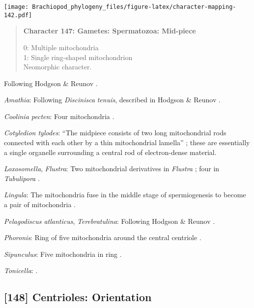 \documentclass[openany]{book}
\theoremstyle{definition}
\theoremstyle{definition}
\theoremstyle{definition}
\theoremstyle{remark}
\begin{document}
\texttt{[image: Brachiopod\_phylogeny\_files/figure-latex/character-mapping-142.pdf]}

\begin{quote}
\textbf{Character 147: Gametes: Spermatozoa: Mid-piece}

0: Multiple mitochondria\\
1: Single ring-shaped mitochondrion\\
Neomorphic character.
\end{quote}

Following Hodgson \& Reunov \citeyearpar{Hodgson1994Ultrastructureof}.

\hypertarget{Amathia-coding-147}{}
\emph{Amathia}: Following \emph{Discinisca} \emph{tenuis}, described in
Hodgson \& Reunov \citeyearpar{Hodgson1994Ultrastructureof}.

\hypertarget{Coolinia_pecten-coding-147}{}
\emph{Coolinia pecten}: Four mitochondria
\citep{Afzelius1978Finestructure}.

\hypertarget{Cotyledion_tylodes-coding-147}{}
\emph{Cotyledion tylodes}: ``The midpiece consists of two long
mitochondrial rods connected with each other by a thin mitochondrial
lamella'' \citep[in \emph{Loxosoma}]{Franzen2000}; these are essentially
a single organelle surrounding a central rod of electron-dense material.

\hypertarget{Flustra-coding-147}{}
\emph{Loxosomella}, \emph{Flustra}: Two mitochondrial derivatives in
\emph{Flustra} \citep{Franzen1981, Franzen1977}; four in
\emph{Tubulipora} \citep{Franzen1984}.

\hypertarget{Lingula-coding-147}{}
\emph{Lingula}: The mitochondria fuse in the middle stage of
spermiogenesis to become a pair of mitochondria
\citep{Reunov2004Ultrastructuralstudy}.

\hypertarget{Pelagodiscus_atlanticus-coding-147}{}
\emph{Pelagodiscus atlanticus}, \emph{Terebratulina}: Following Hodgson
\& Reunov \citeyearpar{Hodgson1994Ultrastructureof}.

\hypertarget{Phoronis-coding-147}{}
\emph{Phoronis}: Ring of five mitochondria around the central centriole
\citep{Rice1993}.

\hypertarget{Sipunculus-coding-147}{}
\emph{Sipunculus}: Five mitochondria in ring \citep{Gherardi2011}.

\hypertarget{Tonicella-coding-147}{}
\emph{Tonicella}: \citet{DufresneDube1983}.

\subsection*{{[}148{]} Centrioles:
Orientation}\label{centrioles-orientation}
\end{document}
